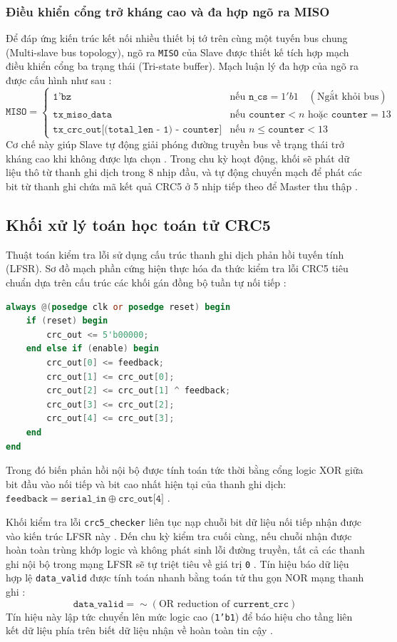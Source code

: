 \subsubsection{Điều khiển cổng trở kháng cao và đa hợp ngõ ra MISO}
Để đáp ứng kiến trúc kết nối nhiều thiết bị tớ trên cùng một tuyến bus chung (Multi-slave bus topology), ngõ ra \texttt{MISO} của Slave được thiết kế tích hợp mạch điều khiển cổng ba trạng thái (Tri-state buffer). Mạch luận lý đa hợp của ngõ ra được cấu hình như sau :
\begin{equation}
    \texttt{MISO} = 
    \begin{cases} 
        \texttt{1'bz} & \text{nếu } \texttt{n\_cs} = 1'b1 \quad (\text{Ngắt khỏi bus})  \\
        \texttt{tx\_miso\_data} & \text{nếu } \texttt{counter} < n \text{ hoặc } \texttt{counter} = 13  \\
        \texttt{tx\_crc\_out[(total\_len - 1) - counter]} & \text{nếu } n \le \texttt{counter} < 13 
    \end{cases}
\end{equation}
Cơ chế này giúp Slave tự động giải phóng đường truyền bus về trạng thái trở kháng cao khi không được lựa chọn . Trong chu kỳ hoạt động, khối sẽ phát dữ liệu thô từ thanh ghi dịch trong 8 nhịp đầu, và tự động chuyển mạch để phát các bit từ thanh ghi chứa mã kết quả CRC5 ở 5 nhịp tiếp theo để Master thu thập .

\subsection{Khối xử lý toán học toán tử CRC5}
Thuật toán kiểm tra lỗi sử dụng cấu trúc thanh ghi dịch phản hồi tuyến tính (LFSR). Sơ đồ mạch phần cứng hiện thực hóa đa thức kiểm tra lỗi CRC5 tiêu chuẩn dựa trên cấu trúc các khối gán đồng bộ tuần tự nối tiếp :
\begin{lstlisting}[language=Verilog]
always @(posedge clk or posedge reset) begin
    if (reset) begin
        crc_out <= 5'b00000; 
    end else if (enable) begin
        crc_out[0] <= feedback; 
        crc_out[1] <= crc_out[0]; 
        crc_out[2] <= crc_out[1] ^ feedback; 
        crc_out[3] <= crc_out[2]; 
        crc_out[4] <= crc_out[3]; 
    end
end
\end{lstlisting}
Trong đó biến phản hồi nội bộ được tính toán tức thời bằng cổng logic XOR giữa bit đầu vào nối tiếp và bit cao nhất hiện tại của thanh ghi dịch: $\texttt{feedback} = \texttt{serial\_in} \oplus \texttt{crc\_out[4]}$ . 

Khối kiểm tra lỗi \texttt{crc5\_checker} liên tục nạp chuỗi bit dữ liệu nối tiếp nhận được vào kiến trúc LFSR này . Đến chu kỳ kiểm tra cuối cùng, nếu chuỗi nhận được hoàn toàn trùng khớp logic và không phát sinh lỗi đường truyền, tất cả các thanh ghi nội bộ trong mạng LFSR sẽ tự triệt tiêu về giá trị \texttt{0} . Tín hiệu báo dữ liệu hợp lệ \texttt{data\_valid} được tính toán nhanh bằng toán tử thu gọn NOR mạng thanh ghi :
\begin{equation}
    \texttt{data\_valid} = \sim(\text{OR reduction of } \texttt{current\_crc}) 
\end{equation}
Tín hiệu này lập tức chuyển lên mức logic cao (\texttt{1'b1}) để báo hiệu cho tầng liên kết dữ liệu phía trên biết dữ liệu nhận về hoàn toàn tin cậy .